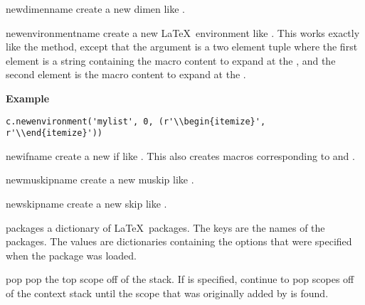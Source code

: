 \begin{methoddesc}[Context]{newdimen}{name}
create a new dimen like .
\end{methoddesc}

\begin{methoddesc}[Context]{newenvironment}{name}
create a new \LaTeX\ environment like .  This works
exactly like the  method, except that the 
 argument is a two element tuple where the first element
is a string containing the macro content to expand at the ,
and the second element is the macro content to expand at the .

\textbf{Example}
\begin{verbatim}
c.newenvironment('mylist', 0, (r'\\begin{itemize}', r'\\end{itemize}'))
\end{verbatim}
\end{methoddesc}

\begin{methoddesc}[Context]{newif}{name}
create a new if like .  This also creates macros corresponding
to  and .
\end{methoddesc}

\begin{methoddesc}[Context]{newmuskip}{name}
create a new muskip like .
\end{methoddesc}

\begin{methoddesc}[Context]{newskip}{name}
create a new skip like .
\end{methoddesc}

\begin{memberdesc}[Context]{packages}
a dictionary of \LaTeX\ packages.  The keys are the names of the packages.
The values are dictionaries containing the options that were specified
when the package was loaded.
\end{memberdesc}

\begin{methoddesc}[Context]{pop}{}
pop the top scope off of the stack.  If  is specified, continue
to pop scopes off of the context stack until the scope that was originally
added by  is found.  
\end{methoddesc}

